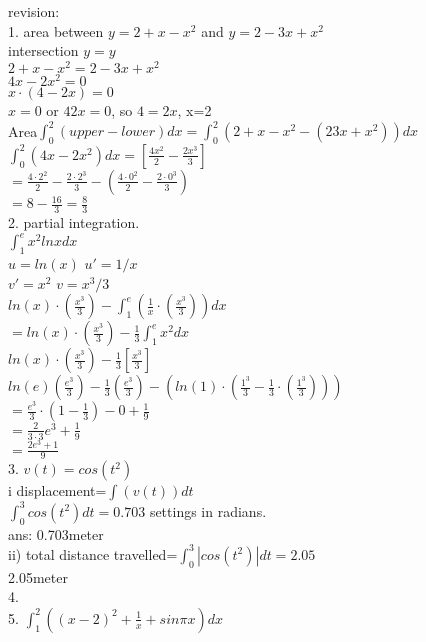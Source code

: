 \documentclass{article}
\begin{document}
  revision:\\
  1. area between $y=2+x-x^2$ and $y=2-3x+x^2$\\
  intersection $y=y$\\
  $2+x-x^2=2-3x+x^2$\\
  $4x-2x^2=0$\\
  $x\cdot(4-2x)=0$\\
  $x=0$ or $42x=0$, so $4=2x$, x=2\\
  Area$\int_{0}^{2}(upper-lower)dx=\int_{0}^{2}(2+x-x^2-(23x+x^2))dx$\\
  $\int_{0}^{2}(4x-2x^2)dx=[\frac{4x^2}{2}-\frac{2x^3}{3}]$\\
  $=\frac{4\cdot 2^2}{2}-\frac{2\cdot2^3}{3}-(\frac{4\cdot0^2}{2}-\frac{2\cdot0^3}{3})$\\
  $=8-\frac{16}{3}=\frac{8}{3}$\\
  2. partial integration.\\
  $\int_{1}^{e}x^2 ln x dx$\\
  $u=ln(x)$ $u'=1/x$\\
  $v'=x^2$ $v=x^3/3$\\
  $ln(x)\cdot(\frac{x^3}{3})-\int_{1}^{e}(\frac{1}{x}\cdot(\frac{x^3}{3}))dx$\\
  $=ln(x)\cdot(\frac{x^3}{3})-\frac{1}{3}\int_{1}^{e}x^2dx$\\
  $ln(x)\cdot(\frac{x^3}{3})-\frac{1}{3}[\frac{x^3}{3}]$\\
  $ln(e)(\frac{e^3}{3})-\frac{1}{3}(\frac{e^3}{3})-(ln(1)\cdot(\frac{1^3}{3}-\frac{1}{3}\cdot(\frac{1^3}{3})))$\\
  $=\frac{e^3}{3}\cdot (1-\frac{1}{3})-0+\frac{1}{9}$\\
  $=\frac{2}{3\cdot3}e^3+\frac{1}{9}$\\
  $=\frac{2e^3+1}{9}$\\
  3. $v(t)=cos(t^2)$ \\
  i displacement=$\int(v(t))dt$\\
  $\int_{0}^{3}cos(t^2)dt=0.703$ settings in radians.\\
  ans: 0.703meter\\
  ii) total distance travelled=$\int_0^3 |cos(t^2)|dt=2.05$\\
  2.05meter\\
  
  4. \\
  5. $\int_{1}^{2}((x-2)^2+\frac{1}{x}+ sin\pi x)dx$\\
      
  


  
\end{document}
